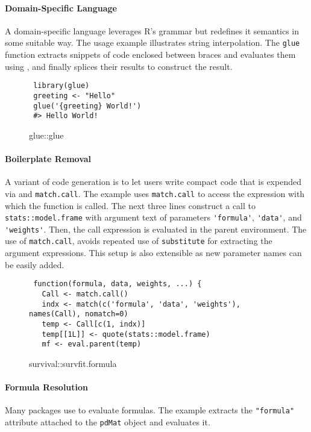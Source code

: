 \documentclass[screen,acmsmall]{acmart}%
\renewcommand{\k}[1]{\lstinline |#1|\xspace}
\begin{document}
\paragraph{Domain-Specific Language}
A domain-specific language leverages R's grammar but redefines it semantics in
some suitable way. The usage example illustrates string interpolation. The
\k{glue} function extracts snippets of code enclosed between braces and
evaluates them using \eval, and finally splices their results to construct the
result.

\begin{figure}[h]
\begin{lstlisting}
 library(glue)
 greeting <- "Hello"
 glue('{greeting} World!')
 #> Hello World!
\end{lstlisting}
  \caption{glue::glue}
\end{figure}


\paragraph{Boilerplate Removal}
A variant of code generation is to let users write compact code that is expended
via \eval and \k{match.call}. The example uses \k{match.call} to access
the expression with which the function is called. The next three lines construct
a call to \k{stats::model.frame} with argument text of parameters
\k{'formula'}, \k{'data'}, and \k{'weights'}. Then, the call expression
is evaluated in the parent environment. The use of \k{match.call}, avoids
repeated use of \k{substitute} for extracting the argument expressions. This
setup is also extensible as new parameter names can be easily added.

\begin{figure}[h]
\begin{lstlisting}
 function(formula, data, weights, ...) {
   Call <- match.call()
   indx <- match(c('formula', 'data', 'weights'), names(Call), nomatch=0)
   temp <- Call[c(1, indx)]
   temp[[1L]] <- quote(stats::model.frame)
   mf <- eval.parent(temp)
\end{lstlisting}
  \caption{survival::survfit.formula}
\end{figure}

\paragraph{Formula Resolution}
Many packages use \eval to evaluate formulas. The example extracts the
\k{"formula"} attribute attached to the \k{pdMat} object and evaluates it.
\end{document}

